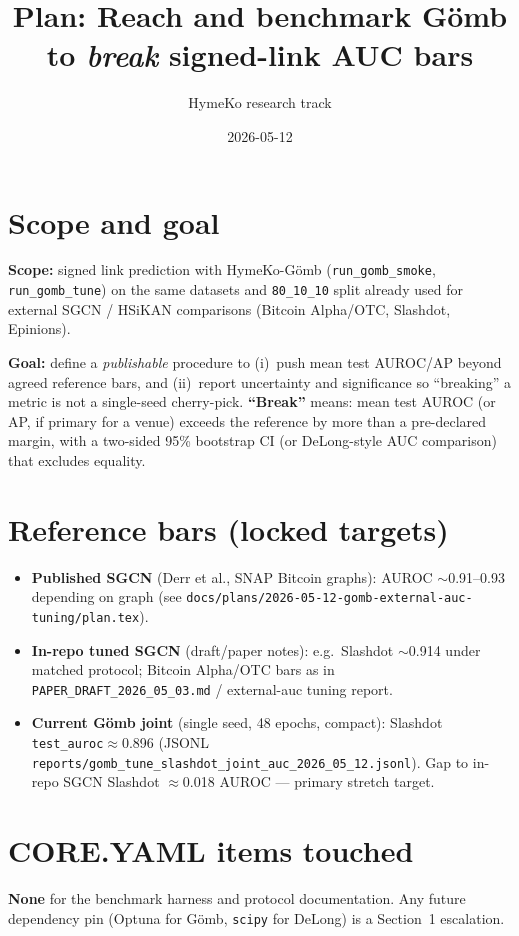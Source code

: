 \documentclass{article}
\title{Plan: Reach and benchmark G\"omb to \emph{break} signed-link AUC bars}
\author{HymeKo research track}
\date{2026-05-12}
\begin{document}
\maketitle

\section*{Scope and goal}
\textbf{Scope:} signed link prediction with HymeKo-G\"omb
(\texttt{run\_gomb\_smoke}, \texttt{run\_gomb\_tune}) on the same datasets
and \texttt{80\_10\_10} split already used for external SGCN / HSiKAN
comparisons (Bitcoin Alpha/OTC, Slashdot, Epinions).

\textbf{Goal:} define a \emph{publishable} procedure to (i)~push mean test
AUROC/AP beyond agreed reference bars, and (ii)~report uncertainty and
significance so ``breaking'' a metric is not a single-seed cherry-pick.
\textbf{``Break''} means: mean test AUROC (or AP, if primary for a venue)
exceeds the reference by more than a pre-declared margin, with a
two-sided 95\% bootstrap CI (or DeLong-style AUC comparison) that excludes
equality.

\section*{Reference bars (locked targets)}
\begin{itemize}
  \item \textbf{Published SGCN} (Derr et al., SNAP Bitcoin graphs):
  AUROC $\sim$0.91--0.93 depending on graph (see
  \texttt{docs/plans/2026-05-12-gomb-external-auc-tuning/plan.tex}).
  \item \textbf{In-repo tuned SGCN} (draft/paper notes): e.g.\ Slashdot
  $\sim$0.914 under matched protocol; Bitcoin Alpha/OTC bars as in
  \texttt{PAPER\_DRAFT\_2026\_05\_03.md} / external-auc tuning report.
  \item \textbf{Current G\"omb joint} (single seed, 48 epochs, compact):
  Slashdot \texttt{test\_auroc}$\approx$0.896 (JSONL
  \texttt{reports/gomb\_tune\_slashdot\_joint\_auc\_2026\_05\_12.jsonl}).
  Gap to in-repo SGCN Slashdot $\approx$0.018 AUROC --- primary stretch target.
\end{itemize}

\section*{CORE.YAML items touched}
\textbf{None} for the benchmark harness and protocol documentation. Any
future dependency pin (Optuna for G\"omb, \texttt{scipy} for DeLong) is a
Section~1 escalation.
\end{document}
